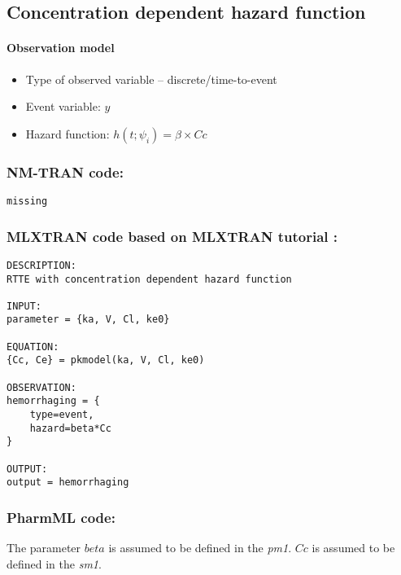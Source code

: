 \subsection{Concentration dependent hazard function}

\paragraph{Observation model}

\begin{itemize}
\item
Type of observed variable -- discrete/time-to-event
\item
Event variable: $y$
\item
Hazard function: $h(t; \psi_i) = \beta \times Cc$
\end{itemize}


\subsubsection{NM-TRAN code:}

\myStartLine
\lstset{language=NONMEMdataSet}
\begin{lstlisting}
missing
\end{lstlisting}
\myEndLine

\subsubsection{MLXTRAN code based on MLXTRAN tutorial \cite{Monolix4.3Tutorial:2014}:}

\myStartLine
\lstset{language=MLXTRANcode}
\begin{lstlisting}
DESCRIPTION: 
RTTE with concentration dependent hazard function

INPUT:
parameter = {ka, V, Cl, ke0}

EQUATION:
{Cc, Ce} = pkmodel(ka, V, Cl, ke0)

OBSERVATION: 
hemorrhaging = {
    type=event, 
    hazard=beta*Cc
}

OUTPUT: 
output = hemorrhaging
\end{lstlisting}
\myEndLine

\subsubsection{PharmML code:}
The parameter $beta$ is assumed to be defined in the  \emph{pm1}.
$Cc$ is assumed to be defined in the  \emph{sm1}.

